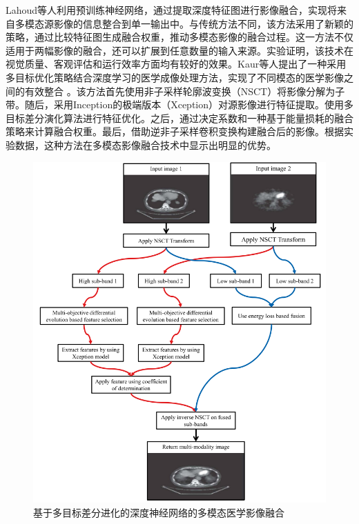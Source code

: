 Lahoud等人\cite{lahoud2019zero}利用预训练神经网络，通过提取深度特征图进行影像融合，实现将来自多模态源影像的信息整合到单一输出中。与传统方法不同，该方法采用了新颖的策略，通过比较特征图生成融合权重，推动多模态影像的融合过程。这一方法不仅适用于两幅影像的融合，还可以扩展到任意数量的输入来源。实验证明，该技术在视觉质量、客观评估和运行效率方面均有较好的效果。Kaur等人\cite{kaur2021multi}提出了一种采用多目标优化策略结合深度学习的医学成像处理方法，实现了不同模态的医学影像之间的有效整合
。该方法首先使用非子采样轮廓波变换（NSCT）将影像分解为子带。随后，采用Inception的极端版本（Xception）对源影像进行特征提取。使用多目标差分演化算法进行特征优化。之后，通过决定系数和一种基于能量损耗的融合策略来计算融合权重。最后，借助逆非子采样卷积变换构建融合后的影像。根据实验数据，这种方法在多模态影像融合技术中显示出明显的优势。
   \begin{figure}[htbp]
      \centering
      \includegraphics[width=0.95\linewidth]{figs/fusionDL.png}
      \caption{基于多目标差分进化的深度神经网络的多模态医学影像融合}\label{fusionDL}
    \end{figure}
  \fi
  

